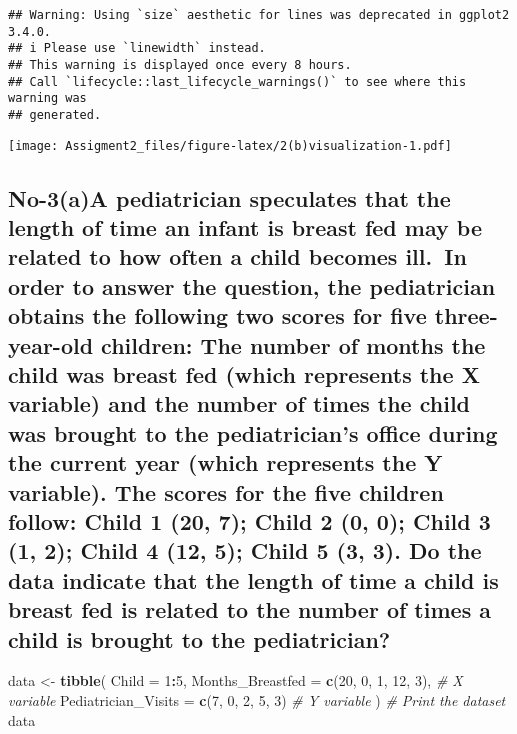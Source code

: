 \documentclass[
]{article}
\newenvironment{Shaded}{\begin{snugshade}}{\end{snugshade}}
\newcommand{\AttributeTok}[1]{\textcolor[rgb]{0.13,0.29,0.53}{#1}}
\newcommand{\CommentTok}[1]{\textcolor[rgb]{0.56,0.35,0.01}{\textit{#1}}}
\newcommand{\DecValTok}[1]{\textcolor[rgb]{0.00,0.00,0.81}{#1}}
\newcommand{\FunctionTok}[1]{\textcolor[rgb]{0.13,0.29,0.53}{\textbf{#1}}}
\newcommand{\NormalTok}[1]{#1}
\newcommand{\OtherTok}[1]{\textcolor[rgb]{0.56,0.35,0.01}{#1}}
\newcommand{\SpecialCharTok}[1]{\textcolor[rgb]{0.81,0.36,0.00}{\textbf{#1}}}
\begin{document}
\begin{verbatim}
## Warning: Using `size` aesthetic for lines was deprecated in ggplot2 3.4.0.
## i Please use `linewidth` instead.
## This warning is displayed once every 8 hours.
## Call `lifecycle::last_lifecycle_warnings()` to see where this warning was
## generated.
\end{verbatim}

\texttt{[image: Assigment2\_files/figure-latex/2(b)visualization-1.pdf]}

\subsection{No-3(a)A pediatrician speculates that the length of time an
infant is breast fed may be related to how often a child becomes ill.~In
order to answer the question, the pediatrician obtains the following two
scores for five three-year-old children: The number of months the child
was breast fed (which represents the X variable) and the number of times
the child was brought to the pediatrician's office during the current
year (which represents the Y variable). The scores for the five children
follow: Child 1 (20, 7); Child 2 (0, 0); Child 3 (1, 2); Child 4 (12,
5); Child 5 (3, 3). Do the data indicate that the length of time a child
is breast fed is related to the number of times a child is brought to
the
pediatrician?}\label{no-3aa-pediatrician-speculates-that-the-length-of-time-an-infant-is-breast-fed-may-be-related-to-how-often-a-child-becomes-ill.-in-order-to-answer-the-question-the-pediatrician-obtains-the-following-two-scores-for-five-three-year-old-children-the-number-of-months-the-child-was-breast-fed-which-represents-the-x-variable-and-the-number-of-times-the-child-was-brought-to-the-pediatricians-office-during-the-current-year-which-represents-the-y-variable.-the-scores-for-the-five-children-follow-child-1-20-7-child-2-0-0-child-3-1-2-child-4-12-5-child-5-3-3.-do-the-data-indicate-that-the-length-of-time-a-child-is-breast-fed-is-related-to-the-number-of-times-a-child-is-brought-to-the-pediatrician}

\begin{Shaded}
\begin{Highlighting}[]
\NormalTok{data }\OtherTok{\textless{}{-}} \FunctionTok{tibble}\NormalTok{(}
  \AttributeTok{Child =} \DecValTok{1}\SpecialCharTok{:}\DecValTok{5}\NormalTok{,}
  \AttributeTok{Months\_Breastfed =} \FunctionTok{c}\NormalTok{(}\DecValTok{20}\NormalTok{, }\DecValTok{0}\NormalTok{, }\DecValTok{1}\NormalTok{, }\DecValTok{12}\NormalTok{, }\DecValTok{3}\NormalTok{), }\CommentTok{\# X variable}
  \AttributeTok{Pediatrician\_Visits =} \FunctionTok{c}\NormalTok{(}\DecValTok{7}\NormalTok{, }\DecValTok{0}\NormalTok{, }\DecValTok{2}\NormalTok{, }\DecValTok{5}\NormalTok{, }\DecValTok{3}\NormalTok{)  }\CommentTok{\# Y variable}
\NormalTok{)}
\CommentTok{\# Print the dataset}
\NormalTok{data}
\end{Highlighting}
\end{Shaded}
\end{document}
